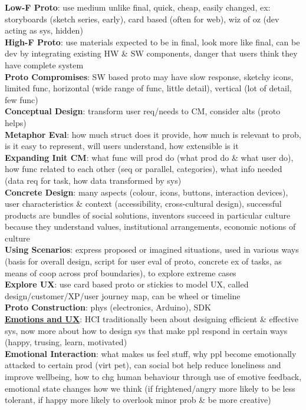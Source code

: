 \documentclass[a4paper]{article}
\begin{document}
\begin{multicols}{3}
        \textbf{Low-F Proto}: use medium unlike final, quick, cheap, easily changed, ex: storyboards (sketch series, early), card based (often for web), wiz of oz (dev acting as sys, hidden)\\
        \textbf{High-F Proto}: use materials expected to be in final, look more like final, can be dev by integrating existing HW \& SW components, danger that users think they have complete system\\
        \textbf{Proto Compromises}: SW based proto may have slow response, sketchy icons, limited func, horizontal (wide range of func, little detail), vertical (lot of detail, few func)\\
        \textbf{Conceptual Design}: transform user req/needs to CM, consider alts (proto helps)\\
        \textbf{Metaphor Eval}: how much struct does it provide, how much is relevant to prob, is it easy to represent, will users understand, how extensible is it\\
        \textbf{Expanding Init CM}: what func will prod do (what prod do \& what user do), how func related to each other (seq or parallel, categories), what info needed (data req for task, how data transformed by sys)\\
        \textbf{Concrete Design}: many aspects (colour, icons, buttons, interaction devices), user characteristics \& context (accessibility, cross-cultural design), successful products are bundles of social solutions, inventors succeed in particular culture because they understand values, institutional arrangements, economic notions of culture\\
        \textbf{Using Scenarios}: express proposed or imagined situations, used in various ways (basis for overall design, script for user eval of proto, concrete ex of tasks, as means of coop across prof boundaries), to explore extreme cases\\
        \textbf{Explore UX}: use card based proto or stickies to model UX, called design/customer/XP/user journey map, can be wheel or timeline\\
        \textbf{Proto Construction}: phys (electronics, Arduino), SDK\\
        \underline{\textbf{Emotions and UX}}: HCI traditionally been about designing efficient \& effective sys, now more about how to design sys that make ppl respond in certain ways (happy, trusing, learn, motivated)\\
        \textbf{Emotional Interaction}: what makes us feel stuff, why ppl become emotionally attacked to certain prod (virt pet), can social bot help reduce loneliness and improve wellbeing, how to chg human behaviour through use of emotive feedback, emotional state changes how we think (if frightened/angry more likely to be less tolerant, if happy more likely to overlook minor prob \& be more creative)\\

\end{multicols}
\end{document}
